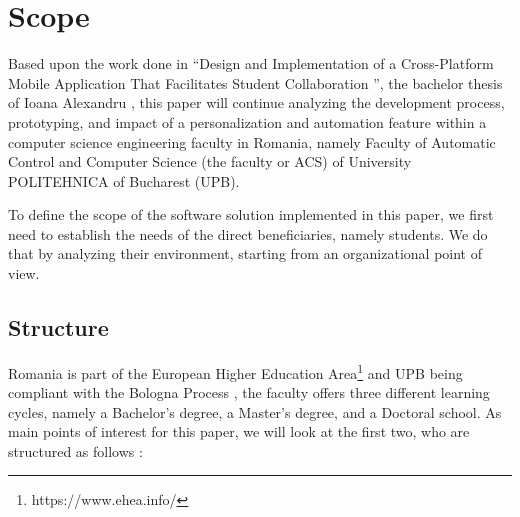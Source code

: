 \chapter{Scope} \label{chapter2}

Based upon the work done in “Design and Implementation of a Cross-Platform Mobile Application That Facilitates Student Collaboration ”, the bachelor thesis of Ioana Alexandru \cite{ioana2020upb}, this paper will continue analyzing the development process, prototyping, and impact of a personalization and automation feature within a computer science engineering faculty in Romania, namely Faculty of Automatic Control and Computer Science (the faculty or ACS) of University POLITEHNICA of Bucharest (UPB). 

To define the scope of the software solution implemented in this paper, we first need to establish the needs of the direct beneficiaries, namely students. We do that by analyzing their environment, starting from an organizational point of view. 


\section{Structure} \label{2:structure}

Romania is part of the European Higher Education Area\footnote{https://www.ehea.info/} and UPB being compliant with the Bologna Process \cite{upb2012bologna}, the faculty offers three different learning cycles, namely a Bachelor’s degree, a Master’s degree, and a Doctoral school. As main points of interest for this paper, we will look at the first two, who are structured as follows :
\clearpage

